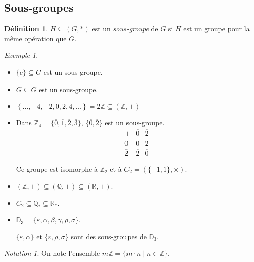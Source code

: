 \documentclass{report}
\theoremstyle{definition}
\newtheorem*{defin}{D\'efinition}
\theoremstyle{remark}
\newtheorem*{exem}{Exemple}
\newtheorem*{nota}{Notation}
\begin{document}
	\subsection{Sous-groupes}
	\begin{defin}
		$H \subseteq (G,*)$ est un \emph{sous-groupe} de $G$ si $H$ est un groupe pour la m\^eme op\'eration que $G$.
	\end{defin}
	\begin{exem}
		~

		\begin{itemize}
			\item $\{e\} \subseteq G$ est un sous-groupe.
			\item $G \subseteq G$ est un sous-groupe.
			\item $\left\lbrace \dotsc, -4, -2, 0, 2, 4, \dotsc \right\rbrace = 2\mathbb{Z} \subseteq (\mathbb{Z},+)$
			\item Dans $\mathbb{Z}_4 = \{\overline0, \overline1, \overline2, \overline3\}$, $\{\overline0, \overline2\}$ est un sous-groupe.
			\renewcommand{\arraystretch}{1.5}
			\[
			\begin{array}{c||c|c}
				+&\overline0&\overline2\\
				\hline\hline
				\overline0&\overline0&\overline2\\
				\hline
				\overline2&\overline2&\overline0
			\end{array}
			\]
			\renewcommand{\arraystretch}{1}

			Ce groupe est isomorphe \`a $\mathbb{Z}_2$ et \`a $C_2=(\{-1,1\}, \times)$.
			\item $(\mathbb{Z},+) \subseteq (\mathbb{Q},+) \subseteq (\mathbb{R},+)$.
			\item $C_2 \subseteq \mathbb{Q}_* \subseteq \mathbb{R}_*$.
			\item $\mathbb{D}_3 = \{\varepsilon, \alpha, \beta, \gamma, \rho, \sigma\}$.

			$\{\varepsilon, \alpha\}$ et $\{\varepsilon, \rho, \sigma\}$ sont des sous-groupes de $\mathbb{D}_3$.
		\end{itemize}
		\begin{nota}
			On note l'ensemble $m\mathbb{Z} = \{m \cdot n \mid n \in \mathbb{Z}\}$.
		\end{nota}
	\end{exem}
\end{document}

